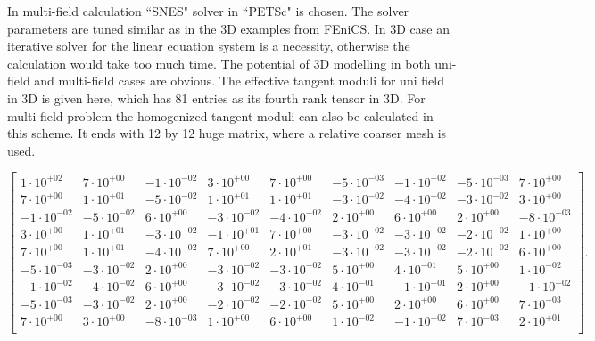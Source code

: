\documentclass[10pt,a4paper]{scrreprt}
\begin{document}
In multi-field calculation ``SNES" solver in ``PETSc" is chosen. The solver parameters are tuned similar as in the 3D examples from FEniCS. In 3D case an iterative solver for the linear equation system is a necessity, otherwise the calculation would take too much time. The potential of 3D modelling in both uni-field and multi-field cases are obvious. The effective tangent moduli for uni field in 3D is given here, which has 81 entries as its fourth rank tensor in 3D. For multi-field problem the homogenized tangent moduli can also be calculated in this scheme. It ends with 12 by 12 huge matrix, where a relative coarser mesh is used.
\begin{center}
\[
\begin{bmatrix}
1 \cdot 10^{+02} & 7 \cdot 10^{+00} & -1 \cdot 10^{-02} & 3 \cdot 10^{+00} & 7 \cdot 10^{+00} & -5 \cdot 10^{-03} & -1 \cdot 10^{-02} & -5 \cdot 10^{-03} & 7 \cdot 10^{+00}\\ 
7 \cdot 10^{+00} & 1 \cdot 10^{+01} & -5 \cdot 10^{-02} & 1 \cdot 10^{+01} & 1 \cdot 10^{+01} & -3 \cdot 10^{-02} & -4 \cdot 10^{-02} & -3 \cdot 10^{-02} & 3 \cdot 10^{+00}\\ 
-1 \cdot 10^{-02} & -5 \cdot 10^{-02} & 6 \cdot 10^{+00} & -3 \cdot 10^{-02} & -4 \cdot 10^{-02} & 2 \cdot 10^{+00} & 6 \cdot 10^{+00} & 2 \cdot 10^{+00} & -8 \cdot 10^{-03}\\ 
3 \cdot 10^{+00} & 1 \cdot 10^{+01} & -3 \cdot 10^{-02} & -1 \cdot 10^{+01} & 7 \cdot 10^{+00} & -3 \cdot 10^{-02} & -3 \cdot 10^{-02} & -2 \cdot 10^{-02} & 1 \cdot 10^{+00}\\ 
7 \cdot 10^{+00} & 1 \cdot 10^{+01} & -4 \cdot 10^{-02} & 7 \cdot 10^{+00} & 2 \cdot 10^{+01} & -3 \cdot 10^{-02} & -3 \cdot 10^{-02} & -2 \cdot 10^{-02} & 6 \cdot 10^{+00}\\ 
-5 \cdot 10^{-03} & -3 \cdot 10^{-02} & 2 \cdot 10^{+00} & -3 \cdot 10^{-02} & -3 \cdot 10^{-02} & 5 \cdot 10^{+00} & 4 \cdot 10^{-01} & 5 \cdot 10^{+00} & 1 \cdot 10^{-02}\\ 
-1 \cdot 10^{-02} & -4 \cdot 10^{-02} & 6 \cdot 10^{+00} & -3 \cdot 10^{-02} & -3 \cdot 10^{-02} & 4 \cdot 10^{-01} & -1 \cdot 10^{+01} & 2 \cdot 10^{+00} & -1 \cdot 10^{-02}\\ 
-5 \cdot 10^{-03} & -3 \cdot 10^{-02} & 2 \cdot 10^{+00} & -2 \cdot 10^{-02} & -2 \cdot 10^{-02} & 5 \cdot 10^{+00} & 2 \cdot 10^{+00} & 6 \cdot 10^{+00} & 7 \cdot 10^{-03}\\ 
7 \cdot 10^{+00} & 3 \cdot 10^{+00} & -8 \cdot 10^{-03} & 1 \cdot 10^{+00} & 6 \cdot 10^{+00} & 1 \cdot 10^{-02} & -1 \cdot 10^{-02} & 7 \cdot 10^{-03} & 2 \cdot 10^{+01}\\ 
\end{bmatrix}.
\]

\end{center}
\end{document}
